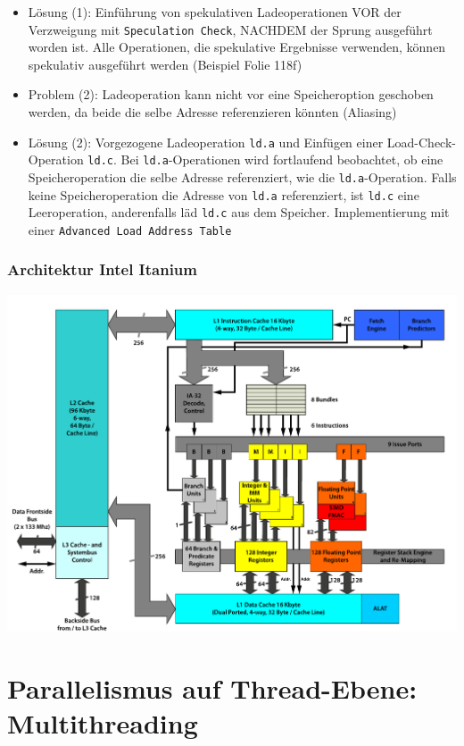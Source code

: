 \begin{itemize}
\begin{itemize}
		\item Lösung (1): Einführung von spekulativen Ladeoperationen VOR der Verzweigung mit \texttt{Speculation Check}, NACHDEM der Sprung ausgeführt worden ist. Alle Operationen, die spekulative Ergebnisse verwenden, können spekulativ ausgeführt werden (Beispiel Folie 118f)
		\item Problem (2): Ladeoperation kann nicht vor eine Speicheroption geschoben werden, da beide die selbe Adresse referenzieren könnten (Aliasing)
		\item Lösung (2): Vorgezogene Ladeoperation \texttt{ld.a} und Einfügen einer Load-Check-Operation \texttt{ld.c}. Bei \texttt{ld.a}-Operationen wird fortlaufend beobachtet, ob eine Speicheroperation die selbe Adresse referenziert, wie die \texttt{ld.a}-Operation. Falls keine Speicheroperation die Adresse von \texttt{ld.a} referenziert, ist \texttt{ld.c} eine Leeroperation, anderenfalls läd \texttt{ld.c} aus dem Speicher. Implementierung mit einer \texttt{Advanced Load Address Table}
	\end{itemize}
\end{itemize}

\subsubsection{Architektur Intel Itanium}
\includegraphics[scale=0.68]{mikroprozessoren2/Itanium_architecture.pdf}



\section{Parallelismus auf Thread-Ebene: Multithreading}

